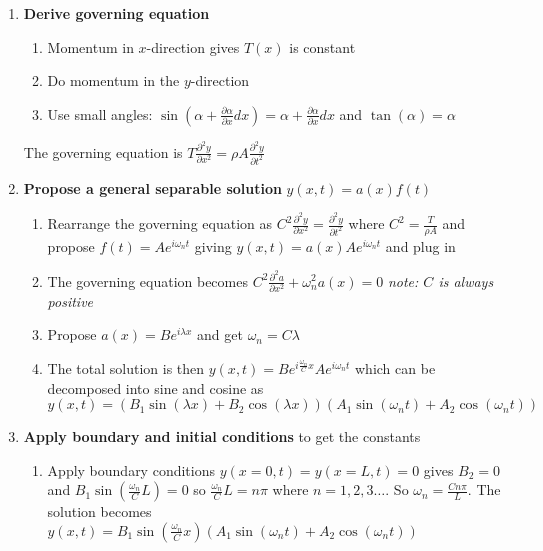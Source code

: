 \documentclass[letterpaper,twocolumn,notitlepage]{article}
\begin{document}
  \begin{enumerate}
    \setlength{\itemsep}{0pt}
    \item{\textbf{Derive governing equation}}
    \begin{enumerate}
      \setlength{\itemsep}{0pt}
      \item{Momentum in $x$-direction gives $T(x)$ is constant}
      \item{Do momentum in the $y$-direction}
      \item{Use small angles: $\sin(\alpha+\frac{\partial\alpha}{\partial x}dx)=\alpha+\frac{\partial\alpha}{\partial x}dx$ and $\tan(\alpha)=\alpha$}
    \end{enumerate}
    The governing equation is $\boxed{T\frac{\partial^{2}y}{\partial x^{2}}=\rho A\frac{\partial^{2}y}{\partial t^{2}}}$
    \item{\textbf{Propose a general separable solution} $\boxed{y(x,t)=a(x)f(t)}$}
    \begin{enumerate}
      \setlength{\itemsep}{0pt}
      \item{Rearrange the governing equation as $C^{2}\frac{\partial^{2}y}{\partial x^{2}}=\frac{\partial^{2}y}{\partial t^{2}}$ where $\boxed{C^{2}=\frac{T}{\rho A}}$ and propose $f(t)=Ae^{i\omega_{n}t}$ giving $y(x,t)=a(x)Ae^{i\omega_{n}t}$ and plug in}
      \item{The governing equation becomes $\boxed{C^{2}\frac{\partial^{2}a}{\partial x^{2}}+\omega_{n}^{2}a(x)=0}$ \textit{note: $C$ is always positive}}
      \item{Propose $a(x)=Be^{i\lambda x}$ and get $\omega_{n}=C\lambda$}
      \item{The total solution is then $\boxed{y(x,t)=Be^{i\frac{\omega_{n}}{C} x}Ae^{i\omega_{n}t}}$ which can be decomposed into sine and cosine as $y(x,t)=(B_{1}\sin(\lambda x)+B_{2}\cos(\lambda x))(A_{1}\sin(\omega_{n}t)+A_{2}\cos(\omega_{n}t))$}
    \end{enumerate}
    \item{\textbf{Apply boundary and initial conditions} to get the constants}
    \begin{enumerate}
      \setlength{\itemsep}{0pt}
      \item{%
        Apply boundary conditions $y(x=0,t)=y(x=L,t)=0$ gives $B_{2}=0$ and $B_{1}\sin(\frac{\omega_{n}}{C}L)=0$ so $\frac{\omega_{n}}{C}L=n\pi$ where $n=1,2,3\dots$.
        So $\omega_{n}=\frac{Cn\pi}{L}$.
        The solution becomes $y(x,t)=B_{1}\sin(\frac{\omega_{n}}{C}x)(A_{1}\sin(\omega_{n}t)+A_{2}\cos(\omega_{n}t))$
      }

\end{enumerate}
\end{enumerate}
\end{document}
